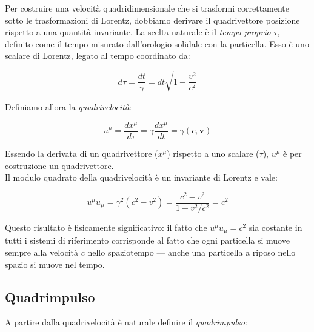 Per costruire una velocità quadridimensionale che si trasformi correttamente sotto le trasformazioni di Lorentz, dobbiamo derivare il quadrivettore posizione rispetto a una quantità invariante. 
La scelta naturale è il \emph{tempo proprio} $\tau$, definito come il tempo misurato dall'orologio solidale con la particella. Esso è uno scalare di Lorentz, legato al tempo coordinato da:

\begin{equation}
    d\tau = \frac{dt}{\gamma} = dt\sqrt{1 - \frac{v^2}{c^2}}
\end{equation}

Definiamo allora la \emph{quadrivelocità}: 

\begin{tcolorbox}[colback=yellow!10!white, colframe=orange!70!black, boxrule=0.8pt]
\begin{equation}\label{eq: quadrivelocità}
    u^\mu = \frac{dx^\mu}{d\tau} = \gamma\frac{dx^\mu}{dt} = \gamma\left(c, \mathbf{v}\right)
\end{equation}
\end{tcolorbox}

Essendo la derivata di un quadrivettore ($x^\mu$) rispetto a uno scalare ($\tau$), $u^\mu$ è per costruzione un quadrivettore.\\

Il modulo quadrato della quadrivelocità è un invariante di Lorentz e vale:

\begin{tcolorbox}[colback=yellow!10!white, colframe=orange!70!black, boxrule=0.8pt]
\begin{equation}
    u^\mu u_\mu = \gamma^2(c^2 - v^2) = \frac{c^2 - v^2}{1 - v^2/c^2} = c^2
\end{equation}
\end{tcolorbox}

Questo risultato è fisicamente significativo: il fatto che $u^\mu u_\mu = c^2$ sia costante in tutti i sistemi di riferimento corrisponde al fatto che ogni particella si muove sempre alla velocità $c$ nello spaziotempo — anche una particella a riposo nello spazio si muove nel tempo.\\

\subsection{Quadrimpulso}

A partire dalla quadrivelocità è naturale definire il \emph{quadrimpulso}: 


